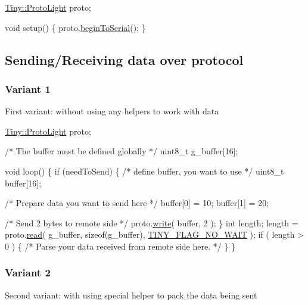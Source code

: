 \begin{DoxyCode}
\hyperlink{classTiny_1_1ProtoLight}{Tiny::ProtoLight} proto;

\textcolor{keywordtype}{void} setup()
\{
    proto.\hyperlink{classTiny_1_1ProtoLight_a50bf63fe1891edda48980ca2893485d7}{beginToSerial}();
\}
\end{DoxyCode}
\hypertarget{arduino_arduino_tiny_send}{}\subsection{Sending/\+Receiving data over protocol}\label{arduino_arduino_tiny_send}
\hypertarget{arduino_arduino_tiny_send_receive1}{}\subsubsection{Variant 1}\label{arduino_arduino_tiny_send_receive1}
First variant\+: without using any helpers to work with data 
\begin{DoxyCode}
\hyperlink{classTiny_1_1ProtoLight}{Tiny::ProtoLight} proto;

\textcolor{comment}{/* The buffer must be defined globally */}
uint8\_t g\_buffer[16];

\textcolor{keywordtype}{void} loop()
\{
    \textcolor{keywordflow}{if} (needToSend)
    \{
        \textcolor{comment}{/* define buffer, you want to use */}
        uint8\_t buffer[16];

        \textcolor{comment}{/* Prepare data you want to send here */}
        buffer[0] = 10;
        buffer[1] = 20;

        \textcolor{comment}{/* Send 2 bytes to remote side */}
        proto.\hyperlink{classTiny_1_1ProtoLight_a46a27ee9d0b55c88672c98abf04dbdce}{write}( buffer, 2 );
    \}
    \textcolor{keywordtype}{int} length;
    length = proto.\hyperlink{classTiny_1_1ProtoLight_acf18a8b73ee6c6394270c903ad7882b8}{read}( g\_buffer, \textcolor{keyword}{sizeof}(g\_buffer), \hyperlink{group__FLAGS__GROUP_gadadd60eb21d7949e6d097ad36aab9b2e}{TINY\_FLAG\_NO\_WAIT} );
    \textcolor{keywordflow}{if} ( length > 0 )
    \{
        \textcolor{comment}{/* Parse your data received from remote side here. */}
    \}
\}
\end{DoxyCode}
\hypertarget{arduino_arduino_tiny_send_receive2}{}\subsubsection{Variant 2}\label{arduino_arduino_tiny_send_receive2}
Second variant\+: with using special helper to pack the data being sent 
